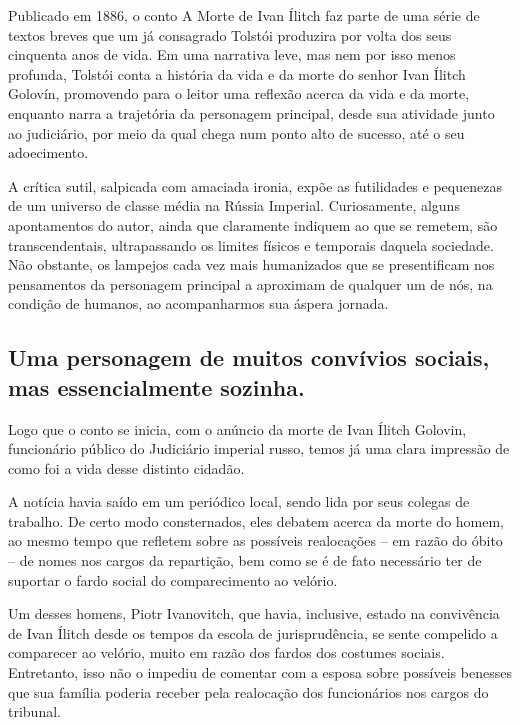 \documentclass[12pt]{extarticle}
\begin{document}
Publicado em 1886, o conto A Morte de Ivan Ílitch faz parte de uma série
de textos breves que um já consagrado Tolstói produzira por volta dos
seus cinquenta anos de vida. Em uma narrativa leve, mas nem por isso
menos profunda, Tolstói conta a história da vida e da morte do senhor
Ivan Ílitch Golovín, promovendo para o leitor uma reflexão acerca da
vida e da morte, enquanto narra a trajetória da personagem
principal, desde sua atividade junto ao judiciário, por meio da qual chega
num ponto alto de sucesso, até o seu adoecimento.




A crítica sutil, salpicada com amaciada ironia, expõe as futilidades e
pequenezas de um universo de classe média na Rússia Imperial.
Curiosamente, alguns apontamentos do autor, ainda que claramente
indiquem ao que se remetem, são transcendentais, ultrapassando os limites
físicos e temporais daquela sociedade. Não obstante, os lampejos cada
vez mais humanizados que se presentificam nos pensamentos da personagem
principal a aproximam de qualquer um de nós, na condição de humanos, ao
acompanharmos sua áspera jornada.

\subsection{Uma personagem de muitos convívios sociais, mas essencialmente
sozinha.}

Logo que o conto se inicia, com o anúncio da morte de Ivan Ílitch
Golovin, funcionário público do Judiciário imperial russo, temos já
uma clara impressão de como foi a vida desse distinto cidadão.

A notícia havia saído em um periódico local, sendo lida por seus colegas de
trabalho. De certo modo consternados, eles debatem acerca da morte do
homem, ao mesmo tempo que refletem sobre as possíveis realocações -- em
razão do óbito -- de nomes nos cargos da repartição, bem como se é de
fato necessário ter de suportar o fardo social do comparecimento ao
velório.

Um desses homens, Piotr Ivanovitch, que havia, inclusive, estado na
convivência de Ivan Ílitch desde os tempos da escola de jurisprudência,
se sente compelido a comparecer ao velório, muito em razão dos fardos
dos costumes sociais. Entretanto, isso não o impediu de comentar com a
esposa sobre possíveis benesses que sua família poderia receber pela
realocação dos funcionários nos cargos do tribunal.
\end{document}
